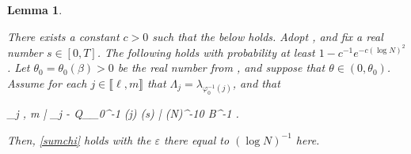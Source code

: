 \documentclass{amsart}
\numberwithin{equation}{section}
\newtheorem{lem}[thm]{Lemma}
\theoremstyle{remark}
\theoremstyle{definition}
\begin{document}
		
		\begin{lem} 
			
			\label{qjt} 
			
			There exists a constant $c>0$ such that the below holds. Adopt , and fix a real number $s \in [0, T]$. The following holds with probability at least $1 - c^{-1} e^{-c(\log N)^2}$. Let $\theta_0 = \theta_0 (\beta) > 0$ be the real number from , and suppose that $\theta \in (0, \theta_0)$. Assume for each $j \in \llbracket \ell, m \rrbracket$ that $\Lambda_j = \lambda_{\varphi_0^{-1} (j)}$, and that
			\begin{flalign}
				\label{lambdajqj}  
				\displaystyle\max_{j \in \llbracket \ell, m \rrbracket} | _j - Q_{\varphi_0^{-1} (j)} (s) | \le (\log N)^{-10} B^{-1} .
			\end{flalign} 
			
			\noindent Then, \eqref{sumchi} holds with the $\varepsilon$ there equal to $(\log N)^{-1}$ here.
			
		\end{lem}
		
\end{document}
